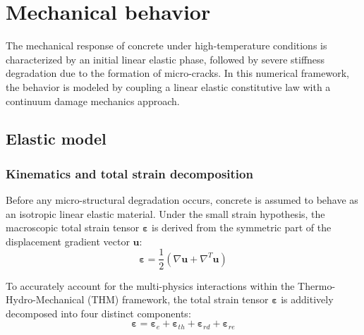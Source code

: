 \documentclass[a4paper,12pt,twoside]{report}     %
\begin{document}
\section{Mechanical behavior}

The mechanical response of concrete under high-temperature conditions is characterized by an initial linear elastic phase, followed by severe stiffness degradation due to the formation of micro-cracks. In this numerical framework, the behavior is modeled by coupling a linear elastic constitutive law with a continuum damage mechanics approach.

\subsection{Elastic model}

\subsubsection{Kinematics and total strain decomposition}
Before any micro-structural degradation occurs, concrete is assumed to behave as an isotropic linear elastic material. Under the small strain hypothesis, the macroscopic total strain tensor $\boldsymbol{\varepsilon}$ is derived from the symmetric part of the displacement gradient vector $\mathbf{u}$:
\begin{equation}
    \boldsymbol{\varepsilon} = \frac{1}{2} \left( \nabla \mathbf{u} + \nabla^T \mathbf{u} \right)
\end{equation}

To accurately account for the multi-physics interactions within the Thermo-Hydro-Mechanical (THM) framework, the total strain tensor $\boldsymbol{\varepsilon}$ is additively decomposed into four distinct components:
\begin{equation}
    \boldsymbol{\varepsilon} = \boldsymbol{\varepsilon}_e + \boldsymbol{\varepsilon}_{th} + \boldsymbol{\varepsilon}_{rd} + \boldsymbol{\varepsilon}_{re}
    \label{eq:strain_decomposition}
\end{equation}
\end{document}
